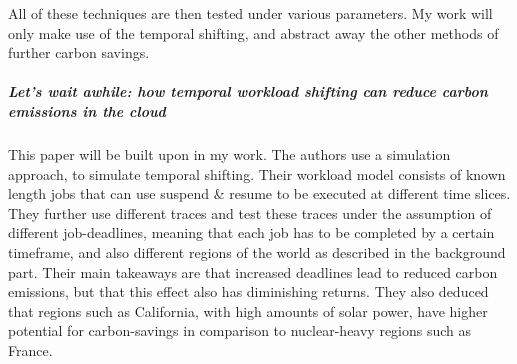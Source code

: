 All of these techniques are then tested under various parameters. My work will only make use of the temporal shifting, and abstract away the other methods of further carbon savings.

\subparagraph{Let's wait awhile: how temporal workload shifting can reduce carbon emissions in the cloud} This paper will be built upon in my work.
The authors \cite{wiesner_lets_2021} use a simulation approach, to simulate temporal shifting. Their workload model consists of known length jobs that can use suspend \& resume to be executed at different time slices. 
They further use different traces and test these traces under the assumption of different job-deadlines, meaning that each job has to be completed by a certain timeframe, and also different regions of the world as described in the background part. 
Their main takeaways are that increased deadlines lead to reduced carbon emissions, but that this effect also has diminishing returns. 
They also deduced that regions such as California, with high amounts of solar power, have higher potential for carbon-savings in comparison to nuclear-heavy regions such as France.